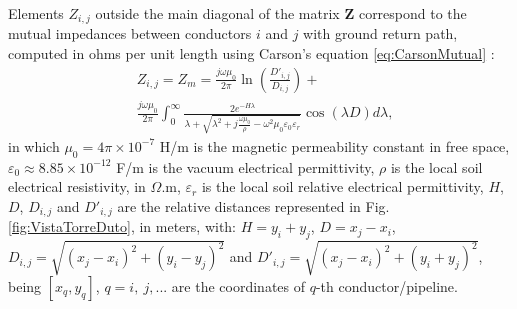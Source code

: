 \documentclass[conference]{IEEEtran}
\begin{document}
	Elements $Z_{i,j}$ outside the main diagonal of the matrix $\mathbf{Z}$ correspond to the mutual impedances between conductors $i$ and $j$ with ground return path, computed in ohms per unit length using Carson's equation \eqref{eq:CarsonMutual} \cite{Carson1926}:
	\begin{equation}\label{eq:CarsonMutual}
		\begin{aligned}
			&Z_{i,j}=Z_{m}= \frac{j\omega\mu_{0}}{2\pi}\ln\left(\frac{{D}'_{i,j}}{D_{i,j}}\right) + \\
			& \frac{j\omega\mu_{0}}{2\pi}\int_{0}^{\infty}\frac{2e^{-H\lambda}}{\lambda+\sqrt{\lambda^2+j\frac{\omega\mu_{0}}{\rho}-\omega^2\mu_{0}\varepsilon_{0}\varepsilon_{r}}}\cos\left( \lambda D \right) d\lambda,
		\end{aligned}
	\end{equation}
	in which $\mu_{0}=4\pi\times10^{-7}$ H/m is the magnetic permeability constant in free space, $\varepsilon_{0}\approx 8.85\times10^{-12}$ F/m is the vacuum electrical permittivity, $\rho$ is the local soil electrical resistivity, in $\Omega$.m, $\varepsilon_{r}$ is the local soil relative electrical permittivity, $H$, $D$, $D_{i,j}$ and ${D}'_{i,j}$ are the relative distances represented in Fig. \ref{fig:VistaTorreDuto}, in meters, with: $H=y_i+y_j$, $D=x_j-x_i$, $D_{i,j}=\sqrt{(x_j-x_i)^2+(y_i-y_j)^2}$ and $D'_{i,j}=\sqrt{(x_j-x_i)^2+(y_i+y_j)^2}$, being $[x_q,y_q]$, $q=i,~j,...$ are the coordinates of $q$-th conductor/pipeline.
	
\end{document}
